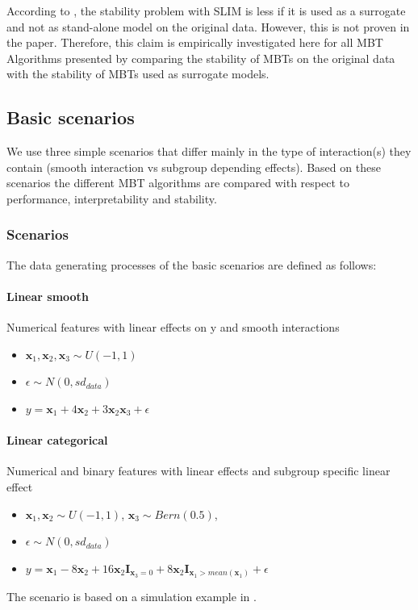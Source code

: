 According to \citep{Hu.2020}, the stability problem with SLIM is less if it is used as a surrogate and not as stand-alone model on the original data. However, this is not proven in the paper. Therefore, this claim is empirically investigated here for all MBT Algorithms presented by comparing the stability of MBTs on the original data with the stability of MBTs used as surrogate models.





\subsection{Basic scenarios}
We use three simple scenarios that differ mainly in the type of interaction(s) they contain (smooth interaction vs subgroup depending effects). Based on these scenarios the different MBT algorithms are compared with respect to performance, interpretability and stability.


\subsubsection{Scenarios}
The data generating processes of the basic scenarios are defined as follows:


\paragraph{Linear smooth}
Numerical features with linear effects on y and smooth interactions
\begin{itemize}
    \item $\textbf{x}_1,\textbf{x}_2, \textbf{x}_3 \sim U(-1,1)$
    \item $\epsilon \sim N(0, sd_{data})$
    \item $ y = \textbf{x}_1 + 4   \textbf{x}_2 + 3   \textbf{x}_2   \textbf{x}_3  + \epsilon$            
           
\end{itemize}                
\paragraph{Linear categorical}
Numerical and binary features with linear effects and subgroup specific linear effect
\begin{itemize}
    \item $\textbf{x}_1, \textbf{x}_2 \sim U(-1,1)$, $\textbf{x}_3 \sim Bern(0.5)$,  
    \item $\epsilon \sim N(0, sd_{data})$
    \item $ y =  \textbf{x}_{1} - 8  \textbf{x}_2 + 16  \textbf{x}_2  \mathbf{I}_{\textbf{x}_3 = 0} + 8  \textbf{x}_2  \mathbf{I}_{\textbf{x}_1 > mean(\textbf{x}_1)} + \epsilon $
            
\end{itemize}
The scenario is based on a simulation example in \citep{Herbinger.2022}.

